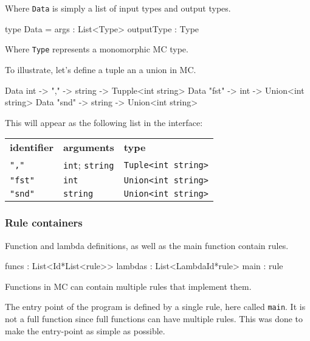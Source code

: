 Where \verb|Data| is simply a list of input types and output types.

\begin{code}
type Data = {
  args       : List<Type>
  outputType : Type
}
\end{code}

Where \verb|Type| represents a monomorphic MC type.


To illustrate, let's define a tuple an a union in MC.

\begin{code}
Data int -> "," -> string -> Tupple<int string>
Data "fst" -> int    -> Union<int string>
Data "snd" -> string -> Union<int string>
\end{code}

This will appear as the following list in the interface:

{\footnotesize
\begin{tabular}{lll}
    \textbf{\normalsize identifier} & \textbf{\normalsize arguments} & \textbf{\normalsize type}\\
    \verb:",":   & \verb:int:; \verb:string: & \verb:Tuple<int string>: \\
    \verb:"fst": & \verb:int:                & \verb:Union<int string>: \\
    \verb:"snd": & \verb:string:             & \verb:Union<int string>: \\
\end{tabular}
}


\subsubsection{Rule containers}

Function and lambda definitions, as well as the main function contain rules.

\begin{code}
  funcs   : List<Id*List<rule>>
  lambdas : List<LambdaId*rule>
  main    : rule
\end{code}

Functions in MC can contain multiple rules that implement them.

The entry point of the program is defined by a single rule, here called \verb|main|.
It is not a full function since full functions can have multiple rules.
This was done to make the entry-point as simple as possible.

